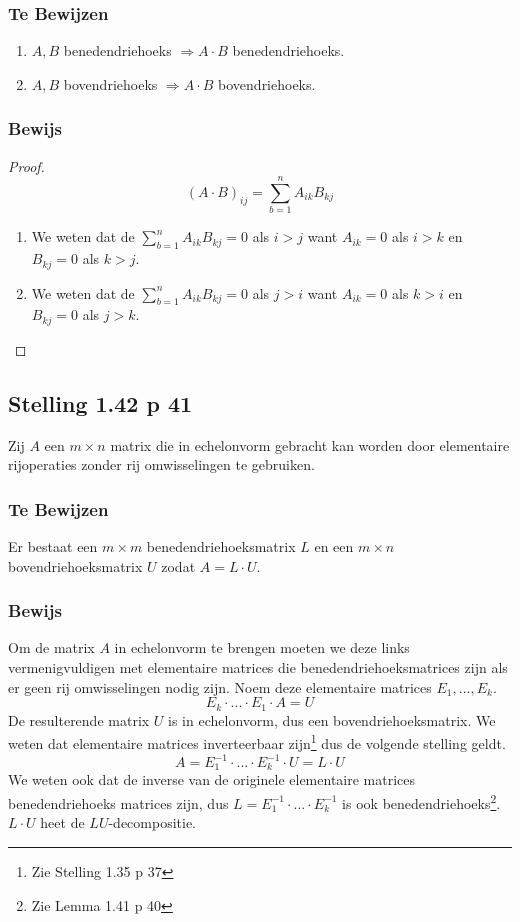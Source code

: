 \documentclass[lineaire_algebra_oplossingen.tex]{subfiles}
\begin{document}
\subsubsection*{Te Bewijzen}
\begin{enumerate}
\item $A,B$ benedendriehoeks $\Rightarrow A\cdot B$ benedendriehoeks.
\item $A,B$ bovendriehoeks $\Rightarrow A\cdot B$ bovendriehoeks.
\end{enumerate}
\subsubsection*{Bewijs}
\begin{proof}
\[
(A\cdot B)_{ij} = \sum_{b=1}^nA_{ik}B_{kj} 
\]
\begin{enumerate}
\item We weten dat de  $\sum_{b=1}^nA_{ik}B_{kj} = 0$ als $i>j$ want $A_{ik} = 0$ als $i>k$ en $B_{kj}=0$ als $k>j$.
\item We weten dat de  $\sum_{b=1}^nA_{ik}B_{kj} = 0$ als $j>i$ want $A_{ik} = 0$ als $k>i$ en $B_{kj}=0$ als $j>k$.
\end{enumerate}
\end{proof}

\subsection{Stelling 1.42 p 41}
Zij $A$ een $m\times n$ matrix die in echelonvorm gebracht kan worden door elementaire rijoperaties zonder rij omwisselingen te gebruiken.
\subsubsection*{Te Bewijzen}
Er bestaat een $m\times m$ benedendriehoeksmatrix $L$ en een $m\times n$ bovendriehoeksmatrix $U$ zodat $A = L\cdot U$.
\subsubsection*{Bewijs}
Om de matrix $A$ in echelonvorm te brengen moeten we deze links vermenigvuldigen met elementaire matrices die benedendriehoeksmatrices zijn als er geen rij omwisselingen nodig zijn. Noem deze elementaire matrices $E_1,...,E_k$.
\[
E_k\cdot ... \cdot E_1 \cdot A = U
\]
De resulterende matrix $U$ is in echelonvorm, dus een bovendriehoeksmatrix. We weten dat elementaire matrices inverteerbaar zijn\footnote{Zie Stelling 1.35 p 37} dus de volgende stelling geldt.
\[
A = E_1^{-1}\cdot ...\cdot E_k^{-1} \cdot U = L\cdot U
\]
We weten ook dat de inverse van de originele elementaire matrices benedendriehoeks matrices zijn, dus $L = E_1^{-1}\cdot ...\cdot E_k^{-1}$ is ook benedendriehoeks\footnote{Zie Lemma 1.41 p 40}.
$L\cdot U$ heet de $LU$-decompositie.
\end{document}
